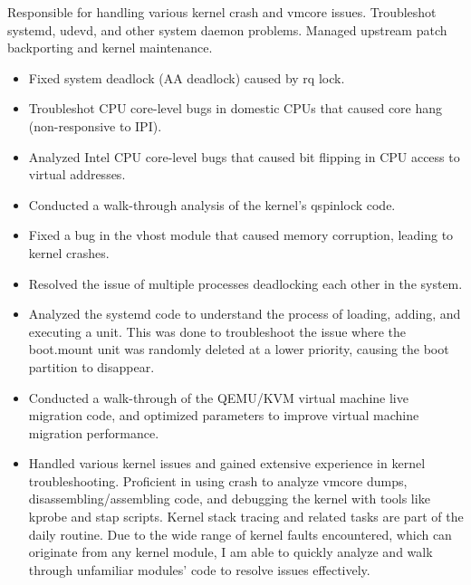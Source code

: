 \documentclass{resume}
\begin{document}
\begin{onehalfspacing}
  Responsible for handling various kernel crash and vmcore issues. Troubleshot systemd, udevd, and other system daemon problems. Managed upstream patch backporting and kernel maintenance.
  \begin{itemize}
  \item Fixed system deadlock (AA deadlock) caused by rq lock.
  \item Troubleshot CPU core-level bugs in domestic CPUs that caused core hang (non-responsive to IPI).
  \item Analyzed Intel CPU core-level bugs that caused bit flipping in CPU access to virtual addresses.
  \item Conducted a walk-through analysis of the kernel's qspinlock code.
  \item Fixed a bug in the vhost module that caused memory corruption, leading to kernel crashes.
  \item Resolved the issue of multiple processes deadlocking each other in the system.
  \item Analyzed the systemd code to understand the process of loading, adding, and executing a unit. This was done to troubleshoot the issue where the boot.mount unit was randomly deleted at a lower priority, causing the boot partition to disappear.
  \item Conducted a walk-through of the QEMU/KVM virtual machine live migration code, and optimized parameters to improve virtual machine migration performance.
  \item Handled various kernel issues and gained extensive experience in kernel troubleshooting. Proficient in using crash to analyze vmcore dumps, disassembling/assembling code, and debugging the kernel with tools like kprobe and stap scripts. Kernel stack tracing and related tasks are part of the daily routine. Due to the wide range of kernel faults encountered, which can originate from any kernel module, I am able to quickly analyze and walk through unfamiliar modules' code to resolve issues effectively.
  \end{itemize}
\end{onehalfspacing}

\end{document}
